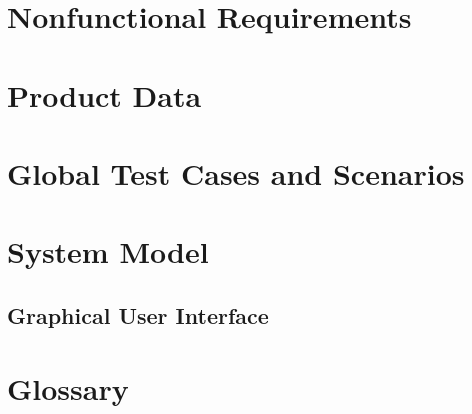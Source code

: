 \documentclass[a4paper, 11pt]{scrartcl}
\begin{document}
\section{Nonfunctional Requirements}


\section{Product Data}


\section{Global Test Cases and Scenarios}


\newpage
\section{System Model}


\newpage
\subsection{Graphical User Interface}


\newpage
\section{Glossary}

\end{document}
